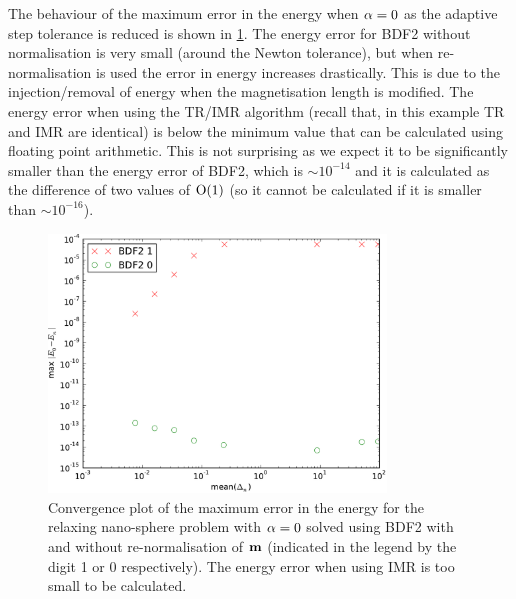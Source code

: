 The behaviour of the maximum error in the energy when $\alpha = 0$ as the adaptive step tolerance is reduced is shown in \cref{fig:energy-aimr-ode}.
The energy error for BDF2 without normalisation is very small (around the Newton tolerance), but when re-normalisation is used the error in energy increases drastically.
This is due to the injection/removal of energy when the magnetisation length is modified.
The energy error when using the TR/IMR algorithm (recall that, in this example TR and IMR are identical) is below the minimum value that can be calculated using floating point arithmetic.
This is not surprising as we expect it to be significantly smaller than the energy error of BDF2, which is $\sim 10^{-14}$ and it is calculated as the difference of two values of $\mathrm{O}{\left( 1 \right)}$ (so it cannot be calculated if it is smaller than $\sim 10^{-16}$).

\begin{figure}
  \centering
  \includegraphics[width=0.8\textwidth]{plots/ode_llg_adaptive_energy/maxabsofenergychangevsmeanofdts}
  \caption{Convergence plot of the maximum error in the energy for the relaxing nano-sphere problem with $\alpha = 0$ solved using BDF2 with and without re-normalisation of $\boldsymbol{\mathrm{m}}$ (indicated in the legend by the digit 1 or 0 respectively). The energy error when using IMR is too small to be calculated.}
  \label{fig:energy-aimr-ode}
\end{figure}

